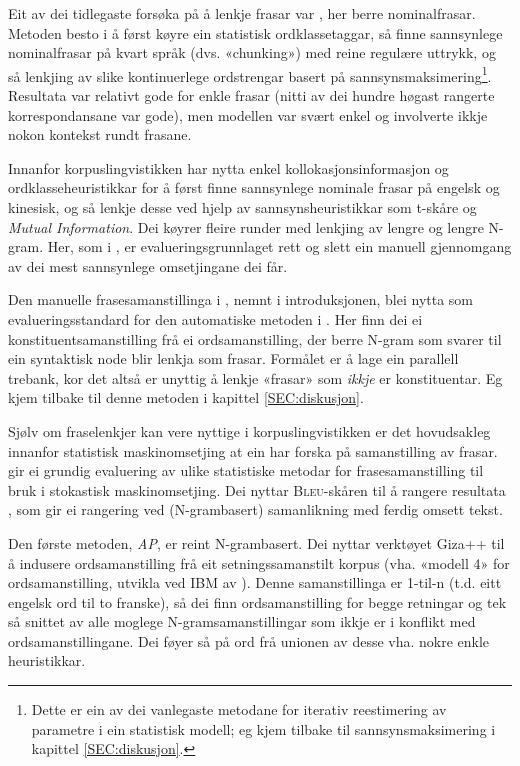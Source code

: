 \documentclass[11pt,a4paper,oneside,draft]{report}
\newcommand{\Bleu}{\textsc{Bleu}}
\begin{document}
Eit av dei tidlegaste forsøka på å lenkje frasar var
\citet{kupiec1993afn}, her berre nominalfrasar. Metoden besto i å
først køyre ein statistisk ordklassetaggar, så finne sannsynlege
nominalfrasar på kvart språk (dvs. «chunking») med reine regulære
uttrykk, og så lenkjing av slike kontinuerlege ordstrengar basert på
sannsynsmaksimering\footnote{Dette er ein av dei vanlegaste metodane for iterativ
        reestimering av parametre i ein statistisk modell; eg kjem
        tilbake til sannsynsmaksimering i kapittel
        \ref{SEC:diskusjon}. }. Resultata var relativt gode for enkle
frasar (nitti av dei hundre høgast rangerte korrespondansane var
gode), men modellen var svært enkel og involverte ikkje nokon kontekst
rundt frasane.

Innanfor korpuslingvistikken har \citet{piao2001mwu} nytta enkel
kollokasjonsinformasjon og ordklasseheuristikkar for å først finne
sannsynlege nominale frasar på engelsk og kinesisk, og så lenkje desse
ved hjelp av sannsynsheuristikkar som t-skåre og \emph{Mutual Information}. Dei køyrer fleire runder med lenkjing av lengre og
lengre N-gram.  Her, som i \citet{kupiec1993afn}, er
evalueringsgrunnlaget rett og slett ein manuell gjennomgang av dei
mest sannsynlege omsetjingane dei får.

Den manuelle frasesamanstillinga i \citet{samuelsson2006pap}, nemnt i
introduksjonen, blei nytta som evalueringsstandard for den automatiske
metoden i \citet{samuelsson2007apa}.  Her finn dei ei
konstituentsamanstilling frå ei ordsamanstilling, der berre N-gram som
svarer til ein syntaktisk node blir lenkja som frasar. Formålet er å
lage ein parallell trebank, kor det altså er unyttig å lenkje «frasar»
som \emph{ikkje} er konstituentar. Eg kjem tilbake til denne metoden i
kapittel \ref{SEC:diskusjon}.

Sjølv om fraselenkjer kan vere nyttige i korpuslingvistikken er det
hovudsakleg innanfor statistisk maskinomsetjing at ein har forska på
samanstilling av frasar. \citet{koehn2003spb} gir ei grundig
evaluering av ulike statistiske metodar for frasesamanstilling til
bruk i stokastisk maskinomsetjing. Dei nyttar \Bleu-skåren til å
rangere resultata
\citep[Papineni~et~al.,~2001,~i][s.~51]{koehn2003spb}, som gir ei
rangering ved (N-grambasert) samanlikning med ferdig omsett tekst.

Den første metoden, \emph{AP}, er reint N-grambasert. Dei nyttar verktøyet
Giza++ \citep[Och~og~Ney,~2000,~i][s.~50]{koehn2003spb} til å indusere
ordsamanstilling frå eit setningssamanstilt korpus (vha. «modell 4»
for ordsamanstilling, utvikla ved IBM av \citet{brown1993msm}). Denne
samanstillinga er 1-til-n (t.d. eitt engelsk ord til to franske), så
dei finn ordsamanstilling for begge retningar og tek så snittet av
alle moglege N-gramsamanstillingar som ikkje er i konflikt med
ordsamanstillingane. Dei føyer så på ord frå unionen av desse
vha. nokre enkle heuristikkar.
\end{document}
